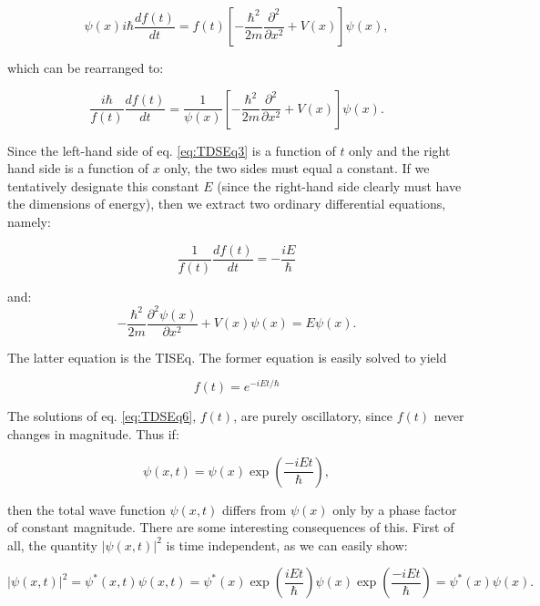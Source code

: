 \documentclass[
  9pt,
]{extbook}
\theoremstyle{definition}
\theoremstyle{definition}
\theoremstyle{definition}
\theoremstyle{remark}
\begin{document}
\begin{equation}
\psi(x) i \hbar \frac{df(t)}{dt} = f(t) \left[-\frac{\hbar^2}{2m} \frac{\partial^2}{\partial x^2} + V(x) \right] \psi(x),
\label{eq:TDSEq2}
\end{equation}

which can be rearranged to:

\begin{equation}
\frac{i \hbar}{f(t)} \frac{df(t)}{dt} = \frac{1}{\psi(x)} \left[-\frac{\hbar^2}{2m} \frac{\partial^2}{\partial x^2} + V(x) \right] \psi(x).
\label{eq:TDSEq3}
\end{equation}

Since the left-hand side of eq. \eqref{eq:TDSEq3} is a function of \(t\) only and the right hand side is a function of \(x\) only, the two sides must equal a constant. If we tentatively designate this constant \(E\) (since the right-hand side clearly must have the dimensions of energy), then we extract two ordinary differential equations, namely:

\begin{equation}
\frac{1}{f(t)} \frac{df(t)}{dt} = - \frac{i E}{\hbar}
\label{eq:TDSEq4}
\end{equation}

and:
\begin{equation}
-\frac{\hbar^2}{2m} \frac{\partial^2\psi(x)}{\partial x^2} + V(x) \psi(x) =
E \psi(x).
\label{eq:TDSEq5}
\end{equation}

The latter equation is the TISEq. The former equation is easily solved to yield

\begin{equation}
f(t) = e^{-iEt / \hbar}
\label{eq:TDSEq6}
\end{equation}

The solutions of eq. \eqref{eq:TDSEq6}, \(f(t)\), are purely oscillatory, since \(f(t)\) never changes in magnitude. Thus if:

\begin{equation}
\psi(x, t) = \psi(x) \exp\left(\frac{-iEt}{\hbar}\right),
\label{eq:TDSEq6b}
\end{equation}

then the total wave function \(\psi(x, t)\) differs from \(\psi(x)\) only by a phase factor of constant magnitude. There are some interesting consequences of this. First of all, the quantity \(\vert \psi(x, t) \vert^2\) is time independent, as we can easily show:

\begin{equation}
\vert \psi(x, t) \vert^2 = \psi^{*}(x, t) \psi(x, t)=
\psi^{*}(x)\exp\left(\frac{iEt}{\hbar}\right)\psi(x)\exp\left(\frac{-iEt}{\hbar}\right)= \psi^{*}(x) \psi(x).
\label{eq:TDSEq7}
\end{equation}
\end{document}
